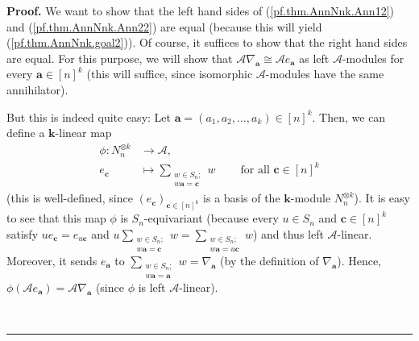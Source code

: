 \documentclass[numbers=enddot,12pt,final,onecolumn,notitlepage]{scrartcl}%
\numberwithin{exer}{subsection}
\theoremstyle{definition}
\newenvironment{proof}[1][Proof]{\noindent\textbf{#1.} }{\ \rule{0.5em}{0.5em}}
\let\sumnonlimits\sum
\renewcommand{\sum}{\sumnonlimits\limits}
\begin{document}
\begin{proof}
We want to show that the left hand sides of (\ref{pf.thm.AnnNnk.Ann12}) and
(\ref{pf.thm.AnnNnk.Ann22}) are equal (because this will yield
(\ref{pf.thm.AnnNnk.goal2})). Of course, it suffices to show that the right
hand sides are equal. For this purpose, we will show that $\mathcal{A}%
\nabla_{\mathbf{a}}\cong\mathcal{A}e_{\mathbf{a}}$ as left $\mathcal{A}%
$-modules for every $\mathbf{a}\in\left[  n\right]  ^{k}$ (this will suffice,
since isomorphic $\mathcal{A}$-modules have the same annihilator).

But this is indeed quite easy: Let $\mathbf{a}=\left(  a_{1},a_{2}%
,\ldots,a_{k}\right)  \in\left[  n\right]  ^{k}$. Then, we can define a
$\mathbf{k}$-linear map%
\begin{align*}
\phi:N_{n}^{\otimes k}  &  \rightarrow\mathcal{A},\\
e_{\mathbf{c}}  &  \mapsto\sum_{\substack{w\in S_{n};\\w\mathbf{a}=\mathbf{c}%
}}w\ \ \ \ \ \ \ \ \ \ \text{for all }\mathbf{c}\in\left[  n\right]  ^{k}%
\end{align*}
(this is well-defined, since $\left(  e_{\mathbf{c}}\right)  _{\mathbf{c}%
\in\left[  n\right]  ^{k}}$ is a basis of the $\mathbf{k}$-module
$N_{n}^{\otimes k}$). It is easy to see that this map $\phi$ is $S_{n}%
$-equivariant (because every $u\in S_{n}$ and $\mathbf{c}\in\left[  n\right]
^{k}$ satisfy $ue_{\mathbf{c}}=e_{u\mathbf{c}}$ and $u\sum_{\substack{w\in
S_{n};\\w\mathbf{a}=\mathbf{c}}}w=\sum_{\substack{w\in S_{n};\\w\mathbf{a}%
=u\mathbf{c}}}w$) and thus left $\mathcal{A}$-linear. Moreover, it sends
$e_{\mathbf{a}}$ to $\sum_{\substack{w\in S_{n};\\w\mathbf{a}=\mathbf{a}%
}}w=\nabla_{\mathbf{a}}$ (by the definition of $\nabla_{\mathbf{a}}$). Hence,
$\phi\left(  \mathcal{A}e_{\mathbf{a}}\right)  =\mathcal{A}\nabla_{\mathbf{a}%
}$ (since $\phi$ is left $\mathcal{A}$-linear).


\end{proof}
\end{document}
